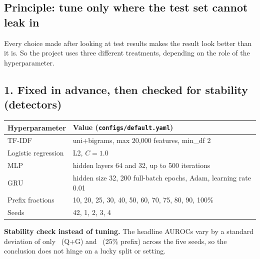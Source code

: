 \documentclass[11pt,a4paper]{article}
\begin{document}
\subsection{Principle: tune only where the test set cannot leak in}
Every choice made after looking at test results makes the result look better than it is. So the
project uses three different treatments, depending on the role of the hyperparameter.

\subsection{1. Fixed in advance, then checked for stability (detectors)}
\begin{tabularx}{\linewidth}{lX}
\toprule
Hyperparameter & Value (\texttt{configs/default.yaml})\\\midrule
TF-IDF & uni+bigrams, max 20,000 features, min\_df 2\\
Logistic regression & L2, $C=1.0$\\
MLP & hidden layers 64 and 32, up to 500 iterations\\
GRU & hidden size 32, 200 full-batch epochs, Adam, learning rate 0.01\\
Prefix fractions & 10, 20, 25, 30, 40, 50, 60, 70, 75, 80, 90, 100\%\\
Seeds & 42, 1, 2, 3, 4\\\bottomrule
\end{tabularx}

\textbf{Stability check instead of tuning.} The headline AUROCs vary by a standard deviation of only
\aucQGSd\ (Q+G) and \aucPASd\ (25\% prefix) across the five seeds, so the conclusion does not hinge on
a lucky split or setting.
\end{document}
